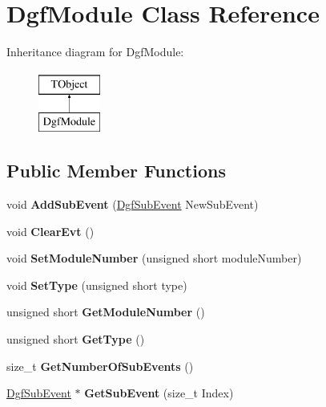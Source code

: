 \hypertarget{class_dgf_module}{\section{Dgf\-Module Class Reference}
\label{class_dgf_module}
}
Inheritance diagram for Dgf\-Module\-:\begin{figure}[H]
\begin{center}
\leavevmode
\includegraphics[height=2.000000cm]{class_dgf_module}
\end{center}
\end{figure}
\subsection*{Public Member Functions}
\begin{DoxyCompactItemize}
\item 
\hypertarget{class_dgf_module_a57667b7eedf5f736b575d32b29ec4ba3}{void {\bfseries Add\-Sub\-Event} (\hyperlink{class_dgf_sub_event}{Dgf\-Sub\-Event} New\-Sub\-Event)}\label{class_dgf_module_a57667b7eedf5f736b575d32b29ec4ba3}

\item 
\hypertarget{class_dgf_module_a2723a18e784f5292ec9ba1f417e699a3}{void {\bfseries Clear\-Evt} ()}\label{class_dgf_module_a2723a18e784f5292ec9ba1f417e699a3}

\item 
\hypertarget{class_dgf_module_a44c6164a64dc7543c57fd1f399477b46}{void {\bfseries Set\-Module\-Number} (unsigned short module\-Number)}\label{class_dgf_module_a44c6164a64dc7543c57fd1f399477b46}

\item 
\hypertarget{class_dgf_module_ad9577d76d5ca21546fdebce9f6183f9d}{void {\bfseries Set\-Type} (unsigned short type)}\label{class_dgf_module_ad9577d76d5ca21546fdebce9f6183f9d}

\item 
\hypertarget{class_dgf_module_afa5b0d56e89f4427fb4facb338897d92}{unsigned short {\bfseries Get\-Module\-Number} ()}\label{class_dgf_module_afa5b0d56e89f4427fb4facb338897d92}

\item 
\hypertarget{class_dgf_module_a338db9255ddcd3fcb58c9678561e9210}{unsigned short {\bfseries Get\-Type} ()}\label{class_dgf_module_a338db9255ddcd3fcb58c9678561e9210}

\item 
\hypertarget{class_dgf_module_aecd2134604c63c0b962318f6e8f928c1}{size\-\_\-t {\bfseries Get\-Number\-Of\-Sub\-Events} ()}\label{class_dgf_module_aecd2134604c63c0b962318f6e8f928c1}

\item 
\hypertarget{class_dgf_module_a398e1293245266eee289f004b3f14ca0}{\hyperlink{class_dgf_sub_event}{Dgf\-Sub\-Event} $\ast$ {\bfseries Get\-Sub\-Event} (size\-\_\-t Index)}\label{class_dgf_module_a398e1293245266eee289f004b3f14ca0}

\end{DoxyCompactItemize}
